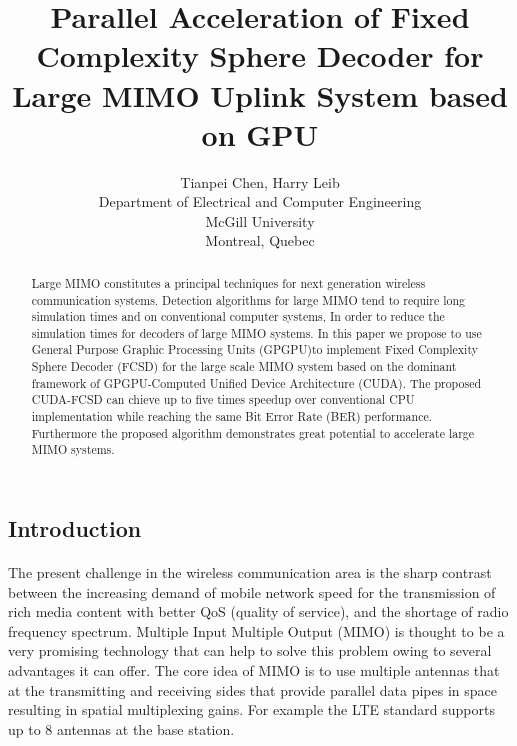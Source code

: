 \documentclass[12pt,a4paper,final]{article}
\title{Parallel Acceleration of Fixed Complexity Sphere Decoder for Large MIMO Uplink System based on GPU}
\author{Tianpei Chen, Harry Leib\\
 Department of Electrical and Computer Engineering\\
 McGill University\\
 Montreal, Quebec}
\begin{document}
\begin{spacing}{2.5}
\maketitle

\begin{abstract}
Large MIMO constitutes a principal techniques for next generation wireless communication systems. Detection algorithms for large MIMO tend to require long simulation times and on conventional computer systems, In order to reduce the simulation times for decoders of large MIMO systems. In this paper we propose to use General Purpose Graphic Processing Units (GPGPU)to implement Fixed Complexity Sphere Decoder (FCSD) for the large scale MIMO system based on the dominant framework of GPGPU-Computed Unified Device Architecture (CUDA). The proposed CUDA-FCSD can chieve up to five times speedup over conventional CPU implementation while reaching the same Bit Error Rate (BER) performance. Furthermore the proposed algorithm demonstrates great potential to accelerate large MIMO systems.
\end{abstract}





%

\section{Introduction}
 \paragraph{} The present challenge in the wireless communication area is the sharp contrast between the increasing demand of mobile network speed for the transmission of rich media content with better QoS (quality of service), and the shortage of radio frequency spectrum. Multiple Input Multiple Output (MIMO) is thought to be a very promising technology that can help to solve this problem owing to several advantages it can offer. The core idea of MIMO is to use multiple antennas that at the transmitting and receiving sides that provide parallel data pipes in space resulting in spatial multiplexing gains\cite{oestges2010mimo}. For example the LTE standard supports up to 8 antennas at the base station\cite{dahlman20103g}. 

\end{spacing}
\end{document}

